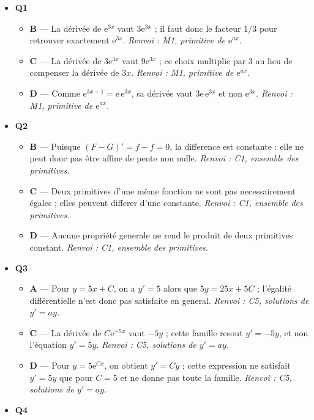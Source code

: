 \begin{itemize}
  \item \textbf{Q1}
  \begin{itemize}
    \item \textbf{B} — La dérivée de $\mathrm e^{3x}$ vaut $3\mathrm e^{3x}$ ; il faut donc le facteur $1/3$ pour retrouver exactement $\mathrm e^{3x}$. \emph{Renvoi : M1, primitive de $\mathrm{e}^{ax}$.}
    \item \textbf{C} — La dérivée de $3\mathrm e^{3x}$ vaut $9\mathrm e^{3x}$ ; ce choix multiplie par $3$ au lieu de compenser la dérivée de $3x$. \emph{Renvoi : M1, primitive de $\mathrm{e}^{ax}$.}
    \item \textbf{D} — Comme $\mathrm e^{3x+1}=\mathrm e\,\mathrm e^{3x}$, sa dérivée vaut $3\mathrm e\,\mathrm e^{3x}$ et non $\mathrm e^{3x}$. \emph{Renvoi : M1, primitive de $\mathrm{e}^{ax}$.}
  \end{itemize}
  \item \textbf{Q2}
  \begin{itemize}
    \item \textbf{B} — Puisque $(F-G)'=f-f=0$, la difference est constante : elle ne peut donc pas être affine de pente non nulle. \emph{Renvoi : C1, ensemble des primitives.}
    \item \textbf{C} — Deux primitives d'une même fonction ne sont pas necessairement égales ; elles peuvent differer d'une constante. \emph{Renvoi : C1, ensemble des primitives.}
    \item \textbf{D} — Aucune propriété generale ne rend le produit de deux primitives constant. \emph{Renvoi : C1, ensemble des primitives.}
  \end{itemize}
  \item \textbf{Q3}
  \begin{itemize}
    \item \textbf{A} — Pour $y=5x+C$, on a $y'=5$ alors que $5y=25x+5C$ ; l'égalité différentielle n'est donc pas satisfaite en general. \emph{Renvoi : C5, solutions de $y'=ay$.}
    \item \textbf{C} — La dérivée de $C\mathrm e^{-5x}$ vaut $-5y$ ; cette famille resout $y'=-5y$, et non l'équation $y'=5y$. \emph{Renvoi : C5, solutions de $y'=ay$.}
    \item \textbf{D} — Pour $y=5\mathrm e^{Cx}$, on obtient $y'=Cy$ ; cette expression ne satisfait $y'=5y$ que pour $C=5$ et ne donne pas toute la famille. \emph{Renvoi : C5, solutions de $y'=ay$.}
  \end{itemize}
  \item \textbf{Q4}

\end{itemize}

